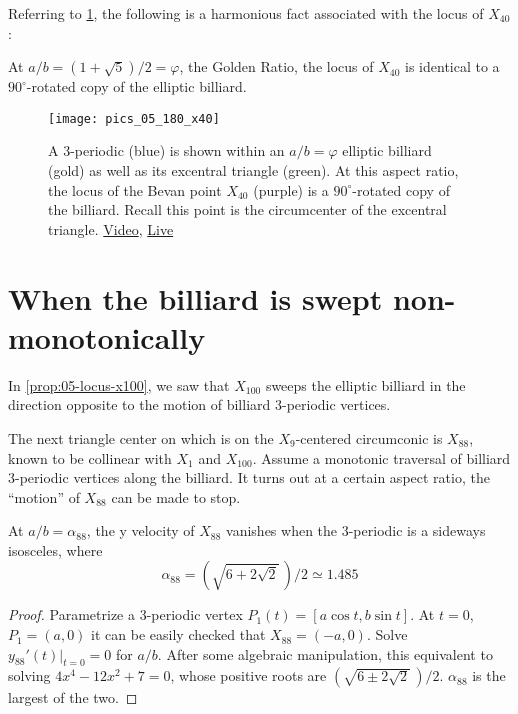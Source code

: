 Referring to \cref{fig:05-x40-golden}, the following is a harmonious fact associated with the locus of $X_{40}$:

\begin{corollary}
At $a/b = (1+\sqrt{5})/2=\varphi$, the Golden Ratio, the locus of $X_{40}$ is identical to a $90^\circ$-rotated copy of the elliptic billiard.
\label{cor:05-x40-golden}
\end{corollary}

\begin{figure}
    \centering
    \texttt{[image: pics\_05\_180\_x40]}
    \caption{A 3-periodic (blue) is shown within an $a/b=\varphi$ elliptic billiard (gold) as well as its excentral triangle (green). At this aspect ratio, the locus of the Bevan point $X_{40}$ (purple) is a $90^\circ$-rotated copy of the billiard. Recall this point is the circumcenter of the excentral triangle. \href{https://youtu.be/rg28gGr-Qeo}{Video}, \href{https://bit.ly/3f4eQ6e}{Live}}
    \label{fig:05-x40-golden}
\end{figure}


\section{When the billiard is swept non-monotonically}
\label{sec:05-non-monotonic}

In \cref{prop:05-locus-x100}, we saw that $X_{100}$ sweeps the elliptic billiard in the direction opposite to the motion of billiard 3-periodic vertices.

The next triangle center on \cite{etc} which is on the $X_9$-centered circumconic is $X_{88}$, known to be collinear with $X_1$ and $X_{100}$. Assume a monotonic traversal of billiard 3-periodic vertices along the billiard. It turns out at a certain aspect ratio, the ``motion'' of $X_{88}$ can be made to stop. 

\begin{proposition}
At $a/b=\alpha_{88}$, the y velocity of $X_{88}$ vanishes when the 3-periodic is a sideways isosceles, where 
\[\alpha_{88}=(\sqrt{6+2\sqrt{2}}\,)/2\simeq{1.485} \]
\end{proposition}

\begin{proof}
Parametrize a 3-periodic vertex $P_1(t)=[a \cos{t},b \sin{t}]$. At $t=0$, $P_1=(a,0)$ it can be easily checked that $X_{88}=(-a,0)$. Solve $y_{88}'(t)|_{t=0}=0$ for $a/b$. After some algebraic manipulation, this equivalent to solving $4x^4-12x^2+7=0$, whose positive roots are $(\sqrt{6\pm 2\sqrt{2}}\,)/2$. $\alpha_{88} $ is the largest of the two.
\end{proof}

